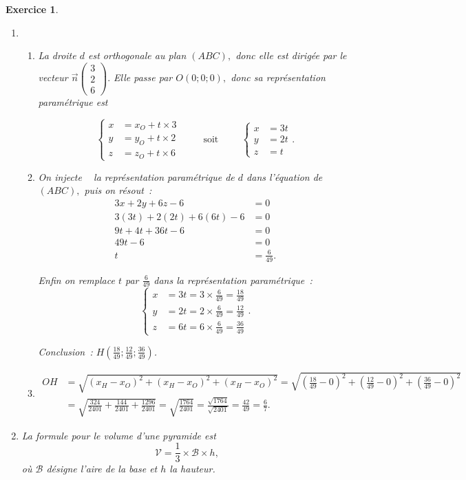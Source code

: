 \documentclass[10pt]{article}
\newtheorem{exo}{Exercice}
\begin{document}
\begin{exo}
\begin{enumerate}
\begin{enumerate}
Conclusion~:
\[(ABC):3x+2y+6z-6=0.\]
		
		
	\end{enumerate}
\item  
	\begin{enumerate}
		\item La droite $d$ est orthogonale au plan $(ABC),$ donc elle est dirigée par le vecteur $\overrightarrow{n}\begin{pmatrix}3\\2\\6\end{pmatrix}.$ Elle passe par $O(0;0;0),$ donc sa représentation paramétrique est

\[\begin{cases}x&=x_O+t\times 3\\y&=y_O+t\times 2\\z&=z_O+t\times 6\end{cases}\hspace{1cm}\text{soit}\hspace{1cm}\begin{cases}x&=3t\\y&=2t\\z&=t\end{cases}.\]

		\item On \og injecte \fg~{} la représentation paramétrique de $d$ dans l'équation de $(ABC),$ puis on résout~:
\begin{align*}
3x+2y+6z-6&=0\\
3(3t)+2(2t)+6(6t)-6&=0\\
9t+4t+36t-6&=0\\
49t-6&=0\\
t&=\frac{6}{49}.
\end{align*}

Enfin on remplace $t$ par $\frac{6}{49}$ dans la représentation paramétrique~:
\[\begin{cases}x&=3t=3\times \frac{6}{49}=\frac{18}{49}\\y&=2t=2\times \frac{6}{49}=\frac{12}{49}\\z&=6t=6\times \frac{6}{49}=\frac{36}{49}\end{cases}.\]

Conclusion~: $H\left(\frac{18}{49};\frac{12}{49};\frac{36}{49}\right)$.
		\item \begin{align*}OH&=\sqrt{\left(x_H-x_O\right)^2+\left(x_H-x_O\right)^2+\left(x_H-x_O\right)^2}=
		\sqrt{\left(\frac{18}{49}-0\right)^2+\left(\frac{12}{49}-0\right)^2+\left(\frac{36}{49}-0\right)^2}
		\\&=\sqrt{\frac{324}{2401}+\frac{144}{2401}+\frac{1296}{2401}}=\sqrt{\frac{1764}{2401}}=\frac{\sqrt{1764}}{\sqrt{2401}}=\frac{42}{49}=\frac{6}{7}.
		\end{align*}
	\end{enumerate}
\item  La formule pour le volume d'une pyramide est 
\[\mathcal{V}=\frac{1}{3}\times\mathcal{B}\times h,\]
où $\mathcal{B}$ désigne l'aire de la base et $h$ la hauteur.


\end{enumerate}
\end{exo}
\end{document}
